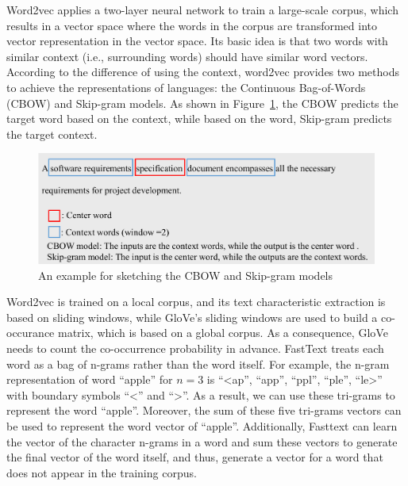 \documentclass[graybox]{svmult}
\begin{document}
Word2vec applies a two-layer neural network to train a large-scale corpus, which results in a vector space where the words in the corpus are transformed into vector representation in the vector space. Its basic idea is that two words with similar context (i.e., surrounding words) should have similar word vectors. According to the difference of using the context, word2vec provides two methods to achieve the representations of languages: the Continuous Bag-of-Words (CBOW) and Skip-gram models. As shown in Figure~\ref{fig:word2vec}, the CBOW predicts the target word based on the context, while based on the word, Skip-gram predicts the target context.

\begin{figure}
\centering
\includegraphics[scale=0.49]{figs/word2vec.pdf}
\caption{An example for sketching the CBOW and Skip-gram models}
\label{fig:word2vec}
\end{figure}

Word2vec is trained on a local corpus, and its text characteristic extraction is based on sliding windows, while GloVe's sliding windows are used to build a co-occurance matrix, which is based on a global corpus. As a consequence, GloVe needs to count the co-occurrence probability in advance. FastText treats each word as a bag of n-grams rather than the word itself. For example, the n-gram representation of word ``apple'' for $n=3$ is ``<ap'', ``app'', ``ppl'', ``ple'', ``le>'' with boundary symbols ``<'' and ``>''. As a result, we can use these tri-grams to represent the word ``apple''. Moreover, the sum of these five tri-grams vectors can be used to represent the word vector of ``apple''. Additionally, Fasttext can learn the vector of the character n-grams in a word and sum these vectors to generate the final vector of the word itself, and thus, generate a vector for a word that does not appear in the training corpus.
\end{document}
